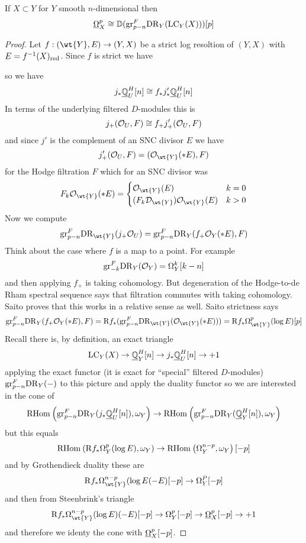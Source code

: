 \documentclass[12pt]{article}
\renewcommand{\gr}{\mathrm{gr}}
\newcommand{\R}{\mathrm{R}}
\begin{document}
\begin{prop}
If $X \subset Y$ for $Y$ smooth $n$-dimensional then
\[ \ulO_X^p \cong \DD(\gr^F_{p-n} \DR_Y(\LC_Y(X))) [p] \]
\end{prop}

\begin{proof}
Let $f : (\wt{Y}, E) \to (Y,X)$ be a strict log resoltion of $(Y, X)$ with $E = f^{-1}(X)_{\mathrm{red}}$. Since $f$ is strict we have
\begin{center}
\end{center}
so we have
\[ j_* \underline{\mathbb{Q}}_U^{H}[n] \cong f_* j_*' \underline{\mathbb{Q}}_U^H[n] \]
In terms of the underlying filtered $D$-modules this is 
\[ j_+(\mathcal{O}_{U}, F) \cong f_+ j'_+ (\mathcal{O}_{U}, F) \]
and since $j'$ is the complement of an SNC divisor $E$ we have
\[ j'_+ (\struct{U}, F) = (\struct{\wt{Y}}(* E), F) \]
for the Hodge filtration $F$ which for an SNC divisor was
\[ F_k \struct{\wt{Y}}(* E) = 
\begin{cases}
\struct{\wt{Y}}(E) & k = 0
\\
(F_k \D_{\wt{Y}}) \struct{\wt{Y}}(E) & k > 0
\end{cases} \]
Now we compute
\[ \gr_{p-n}^F \DR_{\wt{Y}}(j_+ \struct{U}) = \gr_{p-n}^F \DR_{Y}(f_+ \struct{Y}(*E), F) \]
Think about the case where $f$ is a map to a point. For example
\[ \gr_{-k}^F \DR_{Y}(\struct{Y}) = \Omega^k_Y[k-n] \]
and then applying $f_+$ is taking cohomology. But degeneration of the Hodge-to-de Rham spectral sequence says that filtration commutes with taking cohomology. Saito proves that this works in a relative sense as well. Saito strictness says
\[ \gr_{p-n}^F \DR_{Y}(f_+ \struct{Y}(*E), F) = \R f_* (\gr^F_{p-n} \DR_{\wt{Y}}(\struct{\wt{Y}}(*E))) = \R f_* \Omega^p_{\wt{Y}}(\log{E})[p] \]
Recall there is, by definition, an exact triangle
\[ \mathrm{LC}_Y(X) \to \underline{\mathbb{Q}}_Y^H[n] \to j_* \underline{\mathbb{Q}}_U^H[n] \to +1 \]
applying the exact functor (it is exact for ``special'' filtered $D$-modules) $\gr_{p-n}^F \DR_Y(-)$ to this picture and apply the duality functor so we are interested in the cone of
\[ \RHom{}{\gr_{p-n}^F \DR_Y(j_* \ul{\Q}_U^H[n])}{\omega_Y} \to \RHom{}{\gr^F_{p-n} \DR_Y(\ul{\Q}_Y^H[n])}{\omega_Y} \]
but this equals
\[ \RHom{}{\R f_* \Omega_Y^p(\log{E})}{\omega_Y} \to \RHom{}{\Omega_Y^{n-p}}{\omega_Y}[-p] \]
and by Grothendieck duality these are
\[ \R f_* \Omega_{\wt{Y}}^{n-p}(\log{E}(-E)[-p] \to \Omega^P_Y[-p] \]
and then from Steenbrink's triangle
\[ \R f_* \Omega_{\wt{Y}}^{n-p}(\log{E})(-E)[-p] \to \Omega^p_Y[-p] \to \ulO_X^p[-p] \to +1 \]
and therefore we identy the cone with $\underline{\Omega}_X^p[-p]$. 
\end{proof}
\end{document}
